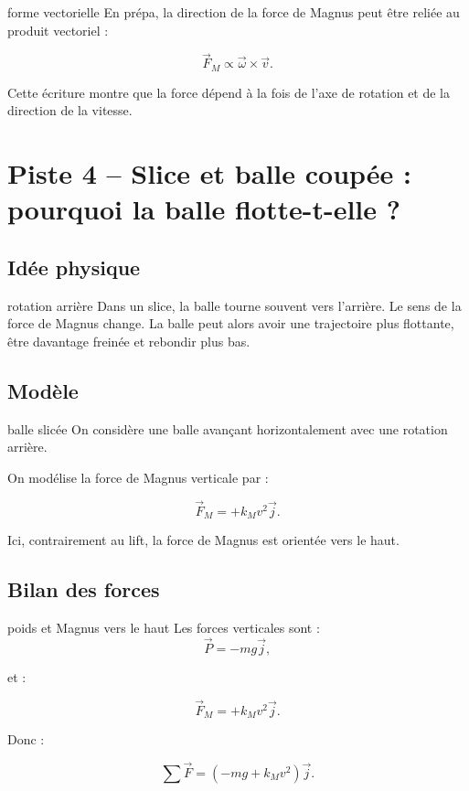 \documentclass[11pt,a4paper]{article}
\begin{document}
\begin{prepa}{forme vectorielle}
En prépa, la direction de la force de Magnus peut être reliée au produit vectoriel :

\[
\vec{F}_M \propto \vec{\omega}\times \vec{v}.
\]

Cette écriture montre que la force dépend à la fois de l'axe de rotation et de la direction de la vitesse.
\end{prepa}

\section{Piste 4 -- Slice et balle coupée : pourquoi la balle flotte-t-elle ?}

\subsection{Idée physique}

\begin{idee}{rotation arrière}
Dans un slice, la balle tourne souvent vers l'arrière. Le sens de la force de Magnus change. La balle peut alors avoir une trajectoire plus flottante, être davantage freinée et rebondir plus bas.
\end{idee}

\subsection{Modèle}

\begin{modele}{balle slicée}
On considère une balle avançant horizontalement avec une rotation arrière.

On modélise la force de Magnus verticale par :

\[
\vec{F}_M=+k_Mv^2\vec{j}.
\]

Ici, contrairement au lift, la force de Magnus est orientée vers le haut.
\end{modele}

\subsection{Bilan des forces}

\begin{bilan}{poids et Magnus vers le haut}
Les forces verticales sont :
\[
\vec{P}=-mg\vec{j},
\]

et :

\[
\vec{F}_M=+k_Mv^2\vec{j}.
\]

Donc :

\[
\sum \vec{F}=(-mg+k_Mv^2)\vec{j}.
\]
\end{bilan}
\end{document}
